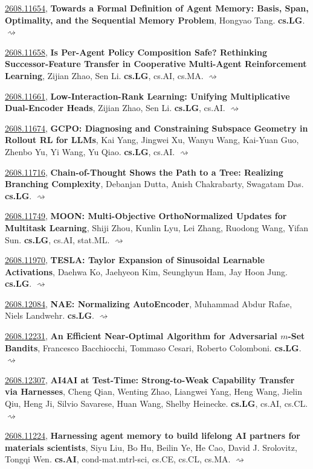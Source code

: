 \documentclass[9pt, a4paper]{article}
\theoremstyle{plain}
\theoremstyle{definition}
\theoremstyle{remark}
\newcommand{\arxiv}[3]{\href{https://arxiv.org/abs/#1}{#1}, \textbf{\textcolor{arxivblue}{#2}}, #3. }
\begin{document}
\arxiv{2608.11654}{Towards a Formal Definition of Agent Memory: Basis, Span, Optimality, and the Sequential Memory Problem}{Hongyao Tang}\textbf{cs.LG}. \hyperlink{2608.11654}{$\rightsquigarrow$}

\arxiv{2608.11658}{Is Per-Agent Policy Composition Safe? Rethinking Successor-Feature Transfer in Cooperative Multi-Agent Reinforcement Learning}{Zijian Zhao, Sen Li}\textbf{cs.LG}, cs.AI, cs.MA. \hyperlink{2608.11658}{$\rightsquigarrow$}

\arxiv{2608.11661}{Low-Interaction-Rank Learning: Unifying Multiplicative Dual-Encoder Heads}{Zijian Zhao, Sen Li}\textbf{cs.LG}, cs.AI. \hyperlink{2608.11661}{$\rightsquigarrow$}

\arxiv{2608.11674}{GCPO: Diagnosing and Constraining Subspace Geometry in Rollout RL for LLMs}{Kai Yang, Jingwei Xu, Wanyu Wang, Kai-Yuan Guo, Zhenbo Yu, Yi Wang, Yu Qiao}\textbf{cs.LG}, cs.AI. \hyperlink{2608.11674}{$\rightsquigarrow$}

\arxiv{2608.11716}{Chain-of-Thought Shows the Path to a Tree: Realizing Branching Complexity}{Debanjan Dutta, Anish Chakrabarty, Swagatam Das}\textbf{cs.LG}. \hyperlink{2608.11716}{$\rightsquigarrow$}

\arxiv{2608.11749}{MOON: Multi-Objective OrthoNormalized Updates for Multitask Learning}{Shiji Zhou, Kunlin Lyu, Lei Zhang, Ruodong Wang, Yifan Sun}\textbf{cs.LG}, cs.AI, stat.ML. \hyperlink{2608.11749}{$\rightsquigarrow$}

\arxiv{2608.11970}{TESLA: Taylor Expansion of Sinusoidal Learnable Activations}{Daehwa Ko, Jaehyeon Kim, Seunghyun Ham, Jay Hoon Jung}\textbf{cs.LG}. \hyperlink{2608.11970}{$\rightsquigarrow$}

\arxiv{2608.12084}{NAE: Normalizing AutoEncoder}{Muhammad Abdur Rafae, Niels Landwehr}\textbf{cs.LG}. \hyperlink{2608.12084}{$\rightsquigarrow$}

\arxiv{2608.12231}{An Efficient Near-Optimal Algorithm for Adversarial $m$-Set Bandits}{Francesco Bacchiocchi, Tommaso Cesari, Roberto Colomboni}\textbf{cs.LG}. \hyperlink{2608.12231}{$\rightsquigarrow$}

\arxiv{2608.12307}{AI4AI at Test-Time: Strong-to-Weak Capability Transfer via Harnesses}{Cheng Qian, Wenting Zhao, Liangwei Yang, Heng Wang, Jielin Qiu, Heng Ji, Silvio Savarese, Huan Wang, Shelby Heinecke}\textbf{cs.LG}, cs.AI, cs.CL. \hyperlink{2608.12307}{$\rightsquigarrow$}

\arxiv{2608.11224}{Harnessing agent memory to build lifelong AI partners for materials scientists}{Siyu Liu, Bo Hu, Beilin Ye, He Cao, David J. Srolovitz, Tongqi Wen}\textbf{cs.AI}, cond-mat.mtrl-sci, cs.CE, cs.CL, cs.MA. \hyperlink{2608.11224}{$\rightsquigarrow$}
\end{document}
